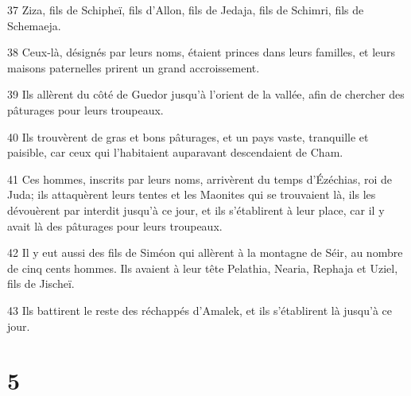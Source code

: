 \par 37 Ziza, fils de Schipheï, fils d'Allon, fils de Jedaja, fils de Schimri, fils de Schemaeja.
\par 38 Ceux-là, désignés par leurs noms, étaient princes dans leurs familles, et leurs maisons paternelles prirent un grand accroissement.
\par 39 Ils allèrent du côté de Guedor jusqu'à l'orient de la vallée, afin de chercher des pâturages pour leurs troupeaux.
\par 40 Ils trouvèrent de gras et bons pâturages, et un pays vaste, tranquille et paisible, car ceux qui l'habitaient auparavant descendaient de Cham.
\par 41 Ces hommes, inscrits par leurs noms, arrivèrent du temps d'Ézéchias, roi de Juda; ils attaquèrent leurs tentes et les Maonites qui se trouvaient là, ils les dévouèrent par interdit jusqu'à ce jour, et ils s'établirent à leur place, car il y avait là des pâturages pour leurs troupeaux.
\par 42 Il y eut aussi des fils de Siméon qui allèrent à la montagne de Séir, au nombre de cinq cents hommes. Ils avaient à leur tête Pelathia, Nearia, Rephaja et Uziel, fils de Jischeï.
\par 43 Ils battirent le reste des réchappés d'Amalek, et ils s'établirent là jusqu'à ce jour.

\chapter{5}

